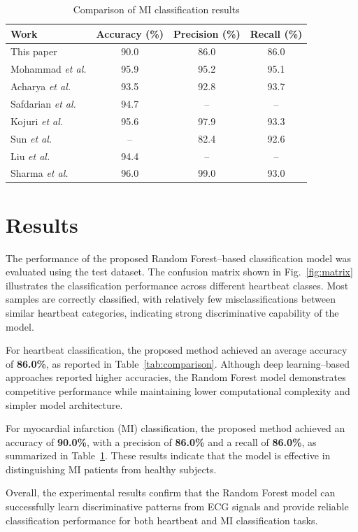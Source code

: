 \documentclass[conference]{IEEEtran}
\begin{document}
\begin{table}[h]
\centering
\caption{Comparison of MI classification results}
\label{tab:mi_comparison}
\begin{tabular}{l c c c}
\hline
\textbf{Work} & \textbf{Accuracy (\%)} & \textbf{Precision (\%)} & \textbf{Recall (\%)} \\
\hline
This paper & 90.0 & 86.0 & 86.0 \\
Mohammad \textit{et al.} & 95.9 & 95.2 & 95.1 \\
Acharya \textit{et al.} & 93.5 & 92.8 & 93.7 \\
Safdarian \textit{et al.} & 94.7 & -- & -- \\
Kojuri \textit{et al.} & 95.6 & 97.9 & 93.3 \\
Sun \textit{et al.} & -- & 82.4 & 92.6 \\
Liu \textit{et al.} & 94.4 & -- & -- \\
Sharma \textit{et al.} & 96.0 & 99.0 & 93.0 \\
\hline
\end{tabular}
\end{table}

\section{Results}
The performance of the proposed Random Forest–based classification model was evaluated using the test dataset. The confusion matrix shown in Fig.~\ref{fig:matrix} illustrates the classification performance across different heartbeat classes. Most samples are correctly classified, with relatively few misclassifications between similar heartbeat categories, indicating strong discriminative capability of the model.

For heartbeat classification, the proposed method achieved an average accuracy of \textbf{86.0\%}, as reported in Table~\ref{tab:comparison}. Although deep learning–based approaches reported higher accuracies, the Random Forest model demonstrates competitive performance while maintaining lower computational complexity and simpler model architecture.

For myocardial infarction (MI) classification, the proposed method achieved an accuracy of \textbf{90.0\%}, with a precision of \textbf{86.0\%} and a recall of \textbf{86.0\%}, as summarized in Table~\ref{tab:mi_comparison}. These results indicate that the model is effective in distinguishing MI patients from healthy subjects.

Overall, the experimental results confirm that the Random Forest model can successfully learn discriminative patterns from ECG signals and provide reliable classification performance for both heartbeat and MI classification tasks.
\end{document}
